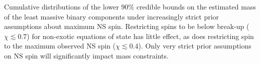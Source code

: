 \label{fig:restricted_priors} Cumulative distributions of the lower $90\%$ credible bounds on the estimated mass of the least massive binary components under increasingly strict prior assumptions about maximum NS spin.  Restricting spins to be below break-up ($\chi\lesssim0.7$) for non-exotic equations of state has little effect, as does restricting spin to the maximum observed NS spin ($\chi\lesssim0.4$).  Only very strict prior assumptions on NS spin will significantly impact mass constraints.